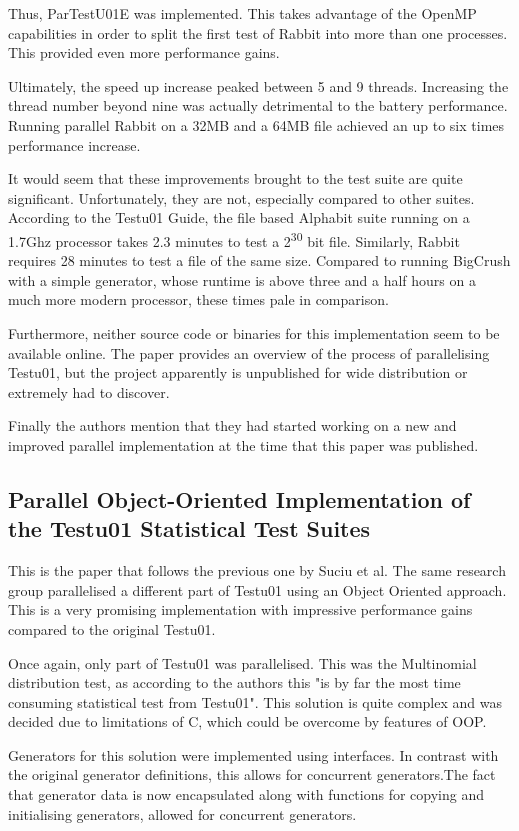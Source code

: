 Thus, ParTestU01E was implemented. This takes advantage of the OpenMP capabilities in order to split the first test of Rabbit into more than one processes. This provided even more performance gains.

Ultimately, the speed up increase peaked between 5 and 9 threads. Increasing the thread number beyond nine was actually detrimental to the battery performance. Running parallel Rabbit on a 32MB and a 64MB file achieved an up to six times performance increase.

It would seem that these improvements brought to the test suite are quite significant. Unfortunately, they are not, especially compared to other suites. According to the Testu01 Guide, the file based Alphabit suite running on a 1.7Ghz processor takes 2.3 minutes to test a 2\textsuperscript{30} bit file. Similarly, Rabbit requires 28 minutes to test a file of the same size. Compared to running BigCrush with a simple generator, whose runtime is above three and a half hours on a much more modern processor, these times pale in comparison.

Furthermore, neither source code or binaries for this implementation seem to be available online. The paper provides an overview of the process of parallelising Testu01, but the project apparently is unpublished for wide distribution or extremely had to discover.

Finally the authors mention that they had started working on a new and improved parallel implementation at the time that this paper was published.

\subsection{Parallel Object-Oriented Implementation of the Testu01 Statistical Test Suites}
This is the paper that follows the previous one by Suciu et al. The same research group parallelised a different part of Testu01 using an Object Oriented approach. This is a very promising implementation with impressive performance gains compared to the original Testu01.

Once again, only part of Testu01 was parallelised. This was the Multinomial distribution test, as according to the authors this "is by far the most time consuming statistical test from Testu01". This solution is quite complex and was decided due to limitations of C, which could be overcome by features of OOP.

Generators for this solution were implemented using interfaces. In contrast with the original generator definitions, this allows for concurrent generators.The fact that generator data is now encapsulated along with functions for copying and initialising generators, allowed for concurrent generators.


